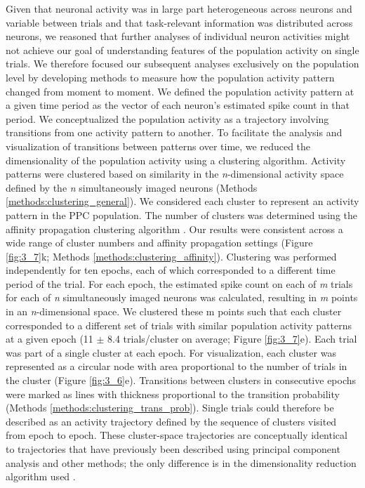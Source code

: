 Given that neuronal activity was in large part heterogeneous across neurons and variable between trials and that task-relevant information was distributed across neurons, we reasoned that further analyses of individual neuron activities might not achieve our goal of understanding features of the population activity on single trials. We therefore focused our subsequent analyses exclusively on the population level by developing methods to measure how the population activity pattern changed from moment to moment. We defined the population activity pattern at a given time period as the vector of each neuron’s estimated spike count in that period. We conceptualized the population activity as a trajectory involving transitions from one activity pattern to another. To facilitate the analysis and visualization of transitions between patterns over time, we reduced the dimensionality of the population activity using a clustering algorithm. Activity patterns were clustered based on similarity in the \textit{n}-dimensional activity space defined by the \textit{n} simultaneously imaged neurons (Methods \ref{methods:clustering_general}). We considered each cluster to represent an activity pattern in the PPC population. The number of clusters was determined using the affinity propagation clustering algorithm \citep{Frey:2007tj}. Our results were consistent across a wide range of cluster numbers and affinity propagation settings (Figure \ref{fig:3_7}k; Methods \ref{methods:clustering_affinity}). Clustering was performed independently for ten epochs, each of which corresponded to a different time period of the trial. For each epoch, the estimated spike count on each of\textit{ m }trials for each of \textit{n} simultaneously imaged neurons was calculated, resulting in \textit{m} points in an \textit{n}-dimensional space. We clustered these m points such that each cluster corresponded to a different set of trials with similar population activity patterns at a given epoch (11 $\pm$ 8.4 trials/cluster on average; Figure \ref{fig:3_7}e). Each trial was part of a single cluster at each epoch. For visualization, each cluster was represented as a circular node with area proportional to the number of trials in the cluster (Figure \ref{fig:3_6}e). Transitions between clusters in consecutive epochs were marked as lines with thickness proportional to the transition probability (Methods \ref{methods:clustering_trans_prob}). Single trials could therefore be described as an activity trajectory defined by the sequence of clusters visited from epoch to epoch. These cluster-space trajectories are conceptually identical to trajectories that have previously been described using principal component analysis and other methods; the only difference is in the dimensionality reduction algorithm used \citep{Harvey:2012du, Churchland:2012bq, Mante:2013ie, Mazor:2005jp, Briggman:2005jd, Raposo:2014df}.

